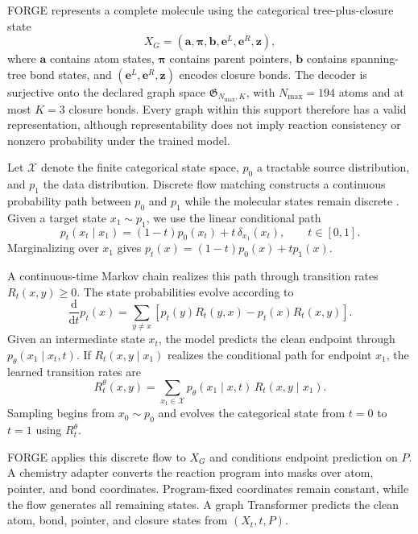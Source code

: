 \documentclass{article}
\begin{document}
FORGE represents a complete molecule using the categorical tree-plus-closure state
\begin{equation}
    X_G=
    \left(
        \mathbf{a},
        \boldsymbol{\pi},
        \mathbf{b},
        \mathbf{e}^{L},
        \mathbf{e}^{R},
        \mathbf{z}
    \right),
\end{equation}
where $\mathbf{a}$ contains atom states, $\boldsymbol{\pi}$ contains parent pointers, $\mathbf{b}$ contains spanning-tree bond states, and $(\mathbf{e}^{L},\mathbf{e}^{R},\mathbf{z})$ encodes closure bonds. The decoder is surjective onto the declared graph space $\mathfrak{G}_{N_{\max},K}$, with $N_{\max}=194$ atoms and at most $K=3$ closure bonds. Every graph within this support therefore has a valid representation, although representability does not imply reaction consistency or nonzero probability under the trained model.

Let $\mathcal{X}$ denote the finite categorical state space, $p_0$ a tractable source distribution, and $p_1$ the data distribution. Discrete flow matching constructs a continuous probability path between $p_0$ and $p_1$ while the molecular states remain discrete \citep{qin2025defog}. Given a target state $x_1\sim p_1$, we use the linear conditional path
\begin{equation}
    p_t(x_t\mid x_1)
    =
    (1-t)p_0(x_t)
    +
    t\,\delta_{x_1}(x_t),
    \qquad t\in[0,1].
\end{equation}
Marginalizing over $x_1$ gives $p_t(x)=(1-t)p_0(x)+tp_1(x)$.

A continuous-time Markov chain realizes this path through transition rates $R_t(x,y)\geq0$. The state probabilities evolve according to
\begin{equation}
    \frac{\mathrm{d}}{\mathrm{d}t}p_t(x)
    =
    \sum_{y\neq x}
    \left[
        p_t(y)R_t(y,x)
        -
        p_t(x)R_t(x,y)
    \right].
\end{equation}
Given an intermediate state $x_t$, the model predicts the clean endpoint through $p_\theta(x_1\mid x_t,t)$. If $R_t(x,y\mid x_1)$ realizes the conditional path for endpoint $x_1$, the learned transition rates are
\begin{equation}
    R_t^\theta(x,y)
    =
    \sum_{x_1\in\mathcal{X}}
    p_\theta(x_1\mid x,t)\,
    R_t(x,y\mid x_1).
\end{equation}
Sampling begins from $x_0\sim p_0$ and evolves the categorical state from $t=0$ to $t=1$ using $R_t^\theta$.

FORGE applies this discrete flow to $X_G$ and conditions endpoint prediction on $P$. A chemistry adapter converts the reaction program into masks over atom, pointer, and bond coordinates. Program-fixed coordinates remain constant, while the flow generates all remaining states. A graph Transformer predicts the clean atom, bond, pointer, and closure states from $(X_t,t,P)$.
\end{document}
